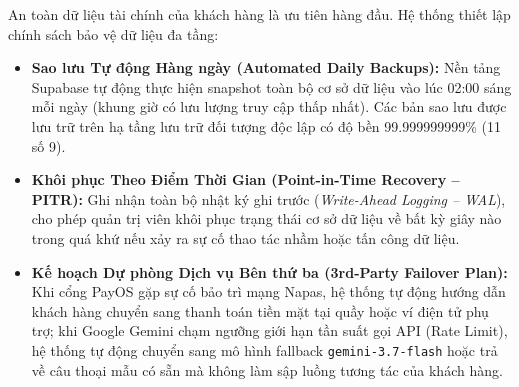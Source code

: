 An toàn dữ liệu tài chính của khách hàng là ưu tiên hàng đầu. Hệ thống thiết lập chính sách bảo vệ dữ liệu đa tầng:
\begin{itemize}
    \item \textbf{Sao lưu Tự động Hàng ngày (Automated Daily Backups):} Nền tảng Supabase tự động thực hiện snapshot toàn bộ cơ sở dữ liệu vào lúc 02:00 sáng mỗi ngày (khung giờ có lưu lượng truy cập thấp nhất). Các bản sao lưu được lưu trữ trên hạ tầng lưu trữ đối tượng độc lập có độ bền 99.999999999\% (11 số 9).
    \item \textbf{Khôi phục Theo Điểm Thời Gian (Point-in-Time Recovery -- PITR):} Ghi nhận toàn bộ nhật ký ghi trước (\textit{Write-Ahead Logging -- WAL}), cho phép quản trị viên khôi phục trạng thái cơ sở dữ liệu về bất kỳ giây nào trong quá khứ nếu xảy ra sự cố thao tác nhầm hoặc tấn công dữ liệu.
    \item \textbf{Kế hoạch Dự phòng Dịch vụ Bên thứ ba (3rd-Party Failover Plan):} Khi cổng PayOS gặp sự cố bảo trì mạng Napas, hệ thống tự động hướng dẫn khách hàng chuyển sang thanh toán tiền mặt tại quầy hoặc ví điện tử phụ trợ; khi Google Gemini chạm ngưỡng giới hạn tần suất gọi API (Rate Limit), hệ thống tự động chuyển sang mô hình fallback \texttt{gemini-3.7-flash} hoặc trả về câu thoại mẫu có sẵn mà không làm sập luồng tương tác của khách hàng.
\end{itemize}